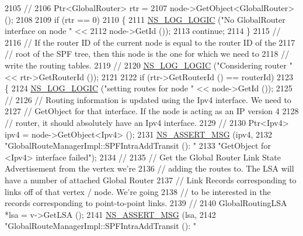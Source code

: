 \begin{DoxyCode}
2105 \textcolor{comment}{// }
2106       Ptr<GlobalRouter> rtr = 
2107         node->GetObject<GlobalRouter> ();
2108 
2109       \textcolor{keywordflow}{if} (rtr == 0)
2110         \{
2111           \hyperlink{group__logging_ga88acd260151caf2db9c0fc84997f45ce}{NS\_LOG\_LOGIC} (\textcolor{stringliteral}{"No GlobalRouter interface on node "} << 
2112                         node->GetId ());
2113           \textcolor{keywordflow}{continue};
2114         \}
2115 \textcolor{comment}{//}
2116 \textcolor{comment}{// If the router ID of the current node is equal to the router ID of the }
2117 \textcolor{comment}{// root of the SPF tree, then this node is the one for which we need to }
2118 \textcolor{comment}{// write the routing tables.}
2119 \textcolor{comment}{//}
2120       \hyperlink{group__logging_ga88acd260151caf2db9c0fc84997f45ce}{NS\_LOG\_LOGIC} (\textcolor{stringliteral}{"Considering router "} << rtr->GetRouterId ());
2121 
2122       \textcolor{keywordflow}{if} (rtr->GetRouterId () == routerId)
2123         \{
2124           \hyperlink{group__logging_ga88acd260151caf2db9c0fc84997f45ce}{NS\_LOG\_LOGIC} (\textcolor{stringliteral}{"setting routes for node "} << node->GetId ());
2125 \textcolor{comment}{//}
2126 \textcolor{comment}{// Routing information is updated using the Ipv4 interface.  We need to }
2127 \textcolor{comment}{// GetObject for that interface.  If the node is acting as an IP version 4 }
2128 \textcolor{comment}{// router, it should absolutely have an Ipv4 interface.}
2129 \textcolor{comment}{//}
2130           Ptr<Ipv4> ipv4 = node->GetObject<Ipv4> ();
2131           \hyperlink{assert_8h_aff5ece9066c74e681e74999856f08539}{NS\_ASSERT\_MSG} (ipv4, 
2132                          \textcolor{stringliteral}{"GlobalRouteManagerImpl::SPFIntraAddTransit (): "}
2133                          \textcolor{stringliteral}{"GetObject for <Ipv4> interface failed"});
2134 \textcolor{comment}{//}
2135 \textcolor{comment}{// Get the Global Router Link State Advertisement from the vertex we're}
2136 \textcolor{comment}{// adding the routes to.  The LSA will have a number of attached Global Router}
2137 \textcolor{comment}{// Link Records corresponding to links off of that vertex / node.  We're going}
2138 \textcolor{comment}{// to be interested in the records corresponding to point-to-point links.}
2139 \textcolor{comment}{//}
2140           GlobalRoutingLSA *lsa = v->GetLSA ();
2141           \hyperlink{assert_8h_aff5ece9066c74e681e74999856f08539}{NS\_ASSERT\_MSG} (lsa, 
2142                          \textcolor{stringliteral}{"GlobalRouteManagerImpl::SPFIntraAddTransit (): "}

\end{DoxyCode}
